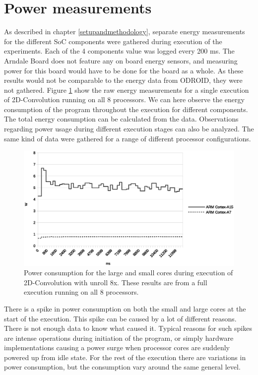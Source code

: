 \section{Power measurements}
As described in chapter \ref{setupandmethodology}, separate energy measurements for the different SoC components were gathered during execution of the experiments.
Each of the 4 components value was logged every 200 ms.
The Arndale Board does not feature any on board energy sensors, and measuring power for this board would have to be done for the board as a whole.
As these results would not be comparable to the energy data from ODROID, they were not gathered.
Figure \ref{powerovertime} show the raw energy measurements for a single execution of 2D-Convolution running on all 8 processors.
We can here observe the energy consumption of the program throughout the execution for different components.
The total energy consumption can be calculated from the data.
Observations regarding power usage during different execution stages can also be analyzed.
The same kind of data were gathered for a range of different processor configurations.

\begin{figure}[H]
  \centering
  \includegraphics[width=160mm]{fig/power-over-time.eps}
  \caption{Power consumption for the large and small cores during execution of 2D-Convolution with unroll 8x. These results are from a full execution running on all 8 processors. \label{overflow}}\label{powerovertime}
\end{figure}
There is a spike in power consumption on both the small and large cores at the start of the execution.
This spike can be caused by a lot of different reasons.
There is not enough data to know what caused it.
Typical reasons for such spikes are intense operations during initiation of the program, or simply hardware implementations causing a power surge when processor cores are suddenly powered up from idle state.
For the rest of the execution there are variations in power consumption, but the consumption vary around the same general level.

